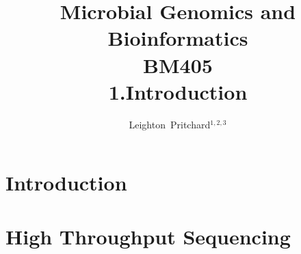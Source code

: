



\title[Microbial Genomics and Bioinformatics: 1.Introduction] %
{Microbial Genomics and \\ Bioinformatics \\
BM405 \\
1.Introduction}
\author[Pritchard] %
{Leighton~Pritchard$^{1,2,3}$}
\subject{Bioinformatics, Genomics, Bacteria, Sequencing, Microbiology, Microbes}





\frame[plain]{\titlepage}



\section{Introduction}


\section{High Throughput Sequencing}




%




